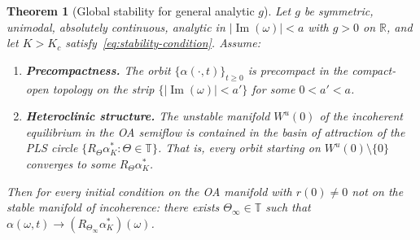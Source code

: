 \documentclass[11pt,a4paper]{article}
\newtheorem{theorem}{Theorem}[section]
\theoremstyle{definition}
\DeclareMathOperator{\im}{Im}
\newcommand{\R}{\mathbb{R}}
\newcommand{\T}{\mathbb{T}}
\begin{document}
\begin{theorem}[Global stability for general analytic $g$]\label{thm:full-range}
Let $g$ be symmetric, unimodal, absolutely continuous, analytic in $|\im(\omega)| < a$ with $g > 0$ on $\R$, and let $K > K_c$ satisfy~\eqref{eq:stability-condition}. Assume:
\begin{enumerate}[label=\textup{(H\arabic*)}]
\item\label{hyp:precompact} \textbf{Precompactness.} The orbit $\{\alpha(\cdot,t)\}_{t \geq 0}$ is precompact in the compact-open topology on the strip $\{|\im(\omega)| < a'\}$ for some $0 < a' < a$.
\item\label{hyp:heteroclinic} \textbf{Heteroclinic structure.} The unstable manifold $W^u(0)$ of the incoherent equilibrium in the OA semiflow is contained in the basin of attraction of the PLS circle $\{R_\Theta\alpha^*_K : \Theta \in \T\}$. That is, every orbit starting on $W^u(0) \setminus \{0\}$ converges to some $R_{\Theta}\alpha^*_K$.
\end{enumerate}
Then for every initial condition on the OA manifold with $r(0) \neq 0$ not on the stable manifold of incoherence: there exists $\Theta_\infty \in \T$ such that $\alpha(\omega,t) \to (R_{\Theta_\infty}\alpha^*_K)(\omega)$.
\end{theorem}
\end{document}
